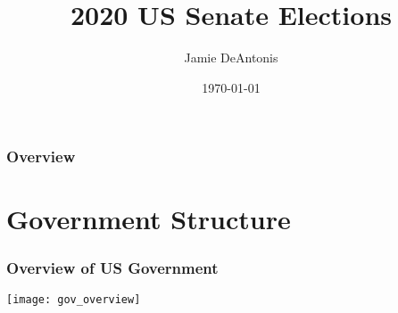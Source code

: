 \documentclass{beamer}
\title[US Senate]{2020 US Senate Elections} %
\author{Jamie DeAntonis} %
\institute[Columbia University] %
{
Columbia University \\ %
\medskip
\textit{jad2295@columbia.edu} %
}
\date{\today} %
\begin{document}
\begin{frame}
\titlepage %
\end{frame}

\begin{frame}
\frametitle{Overview} %
\tableofcontents %
\end{frame}


\section{Government Structure} %

\begin{frame}
\frametitle{Overview of US Government}

\begin{centering}

\texttt{[image: gov\_overview]}

\end{centering}

\end{frame}

\end{document}
